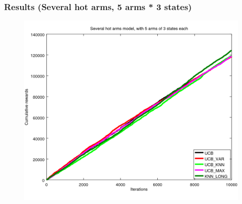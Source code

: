 \documentclass[french]{beamer}
\begin{document}
\begin{frame}
	\frametitle{Results (Several hot arms, 5 arms * 3 states)}

	\begin{figure}[h]
		\begin{center}
			\vspace{-10pt}
			\includegraphics[width=1.05\textheight]{all_ms_10000it.png}

			\vspace{-10pt}
		\end{center}
	\end{figure}
\end{frame}
\end{document}
